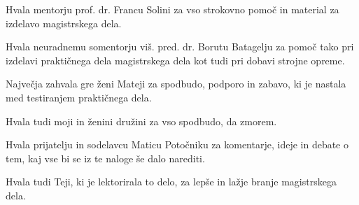 Hvala mentorju prof. dr. Francu Solini za vso strokovno pomoč in material za izdelavo magistrskega dela.

Hvala neuradnemu somentorju viš. pred. dr. Borutu Batagelju za pomoč tako pri izdelavi praktičnega dela magistrskega dela kot tudi pri dobavi strojne opreme.

Največja zahvala gre ženi Mateji za spodbudo, podporo in zabavo, ki je nastala med testiranjem praktičnega dela.

Hvala tudi moji in ženini družini za vso spodbudo, da zmorem.

Hvala prijatelju in sodelavcu Maticu Potočniku za komentarje, ideje in debate o tem, kaj vse bi se iz te naloge še dalo narediti.

Hvala tudi Teji, ki je lektorirala to delo, za lepše in lažje branje magistrskega dela.

